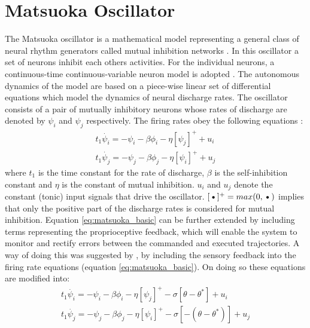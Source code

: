 \documentclass[12pt,twoside]{article}
\theoremstyle{plain}
\theoremstyle{definition}
\theoremstyle{remark}
\newcommand{\forceindent}{\leavevmode{\parindent=2em\indent}}
\begin{document}
\section{Matsuoka Oscillator}
\label{sec:Matsuoka_Oscillator}
\forceindent The Matsuoka oscillator is a mathematical model representing a general class of neural rhythm generators called mutual inhibition networks \cite{Matsuoka1987}. In this oscillator a set of neurons inhibit each others activities. For the individual neurons, a continuous-time continuous-variable neuron model is adopted \cite{Matsuoka1987}. The autonomous dynamics of the model are based on a piece-wise linear set of differential equations which model the dynamics of neural discharge rates. The oscillator consists of a pair of mutually inhibitory neurons whose rates of discharge are denoted by $\psi_i$ and $\psi_j$ respectively. The firing rates obey the following equations \cite{Ronsse2009}: 
\begin{subequations} 
\label{eq:matsuoka_basic}
\begin{align}
 t_1 \dot{\psi_i}=-\psi_i - \beta \phi_i - \eta [\psi_j]^+ + u_i\\
 t_1 \dot{\psi_j}=-\psi_j - \beta \phi_j - \eta [\psi_i]^+ + u_j
 \end{align}
\end{subequations}
where $t_1$ is the time constant for the rate of discharge, $\beta$ is the self-inhibition constant and $\eta$ is the constant of mutual inhibition. $u_i$ and $u_j$ denote the constant (tonic) input signals that drive the oscillator. $[\textbf{\textbullet}]^+=max(0,\textbf{\textbullet})$ implies that only the positive part of the discharge rates is considered for mutual inhibition. Equation  \ref{eq:matsuoka_basic} can be further extended by including terms representing the proprioceptive feedback, which will enable the system to monitor and rectify errors between the commanded and executed trajectories. A way of doing this was suggested by \cite{Williamson1998}, by including the sensory feedback into the firing rate equations (equation \ref{eq:matsuoka_basic}). On doing so these equations are modified into:
\begin{subequations} 
\label{eq:matsuoka_extended}
\begin{align}
 t_1 \dot{\psi_i}=-\psi_i - \beta \phi_i - \eta [\psi_j]^+ - \sigma [\theta - \theta^{*}] + u_i\\
 t_1 \dot{\psi_j}=-\psi_j - \beta \phi_j - \eta [\psi_i]^+ - \sigma [-(\theta - \theta^{*})] + u_j
 \end{align}
\end{subequations}
\end{document}
